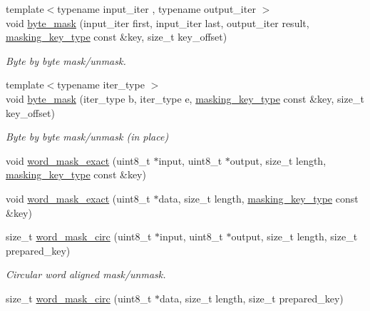 \begin{DoxyCompactItemize}
{\footnotesize template$<$typename input\+\_\+iter , typename output\+\_\+iter $>$ }\\void \hyperlink{namespacewebsocketpp_1_1frame_a417650d76aa2433163942d6a13334a6a}{byte\+\_\+mask} (input\+\_\+iter first, input\+\_\+iter last, output\+\_\+iter result, \hyperlink{namespacewebsocketpp_1_1frame_a8bdac8ec44c78c027fcf55aa3bad3f86}{masking\+\_\+key\+\_\+type} const \&key, size\+\_\+t key\+\_\+offset)
\begin{DoxyCompactList}\small\item\em Byte by byte mask/unmask. \end{DoxyCompactList}\item 
{\footnotesize template$<$typename iter\+\_\+type $>$ }\\void \hyperlink{namespacewebsocketpp_1_1frame_a57740a0ac6dca6789eb3d020b7f31ed8}{byte\+\_\+mask} (iter\+\_\+type b, iter\+\_\+type e, \hyperlink{namespacewebsocketpp_1_1frame_a8bdac8ec44c78c027fcf55aa3bad3f86}{masking\+\_\+key\+\_\+type} const \&key, size\+\_\+t key\+\_\+offset)
\begin{DoxyCompactList}\small\item\em Byte by byte mask/unmask (in place) \end{DoxyCompactList}\item 
void \hyperlink{namespacewebsocketpp_1_1frame_acaaa889ec2dc660d7a3cbb310e1a118c}{word\+\_\+mask\+\_\+exact} (uint8\+\_\+t $\ast$input, uint8\+\_\+t $\ast$output, size\+\_\+t length, \hyperlink{namespacewebsocketpp_1_1frame_a8bdac8ec44c78c027fcf55aa3bad3f86}{masking\+\_\+key\+\_\+type} const \&key)
\item 
void \hyperlink{namespacewebsocketpp_1_1frame_a6ef7d51858a5c357c009af6945ab5bf0}{word\+\_\+mask\+\_\+exact} (uint8\+\_\+t $\ast$data, size\+\_\+t length, \hyperlink{namespacewebsocketpp_1_1frame_a8bdac8ec44c78c027fcf55aa3bad3f86}{masking\+\_\+key\+\_\+type} const \&key)
\item 
size\+\_\+t \hyperlink{namespacewebsocketpp_1_1frame_aa3458068f08acb26e350e39375265085}{word\+\_\+mask\+\_\+circ} (uint8\+\_\+t $\ast$input, uint8\+\_\+t $\ast$output, size\+\_\+t length, size\+\_\+t prepared\+\_\+key)
\begin{DoxyCompactList}\small\item\em Circular word aligned mask/unmask. \end{DoxyCompactList}\item 
size\+\_\+t \hyperlink{namespacewebsocketpp_1_1frame_af1365b296d14ee7dea6e17d0af368821}{word\+\_\+mask\+\_\+circ} (uint8\+\_\+t $\ast$data, size\+\_\+t length, size\+\_\+t prepared\+\_\+key)

\end{DoxyCompactItemize}
